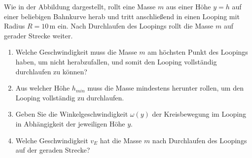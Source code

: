 \begin{ExerciseBlock}
Wie in der Abbildung dargestellt, rollt eine Masse $m$ aus einer Höhe $y=h$ auf einer beliebigen Bahnkurve herab und tritt anschließend in einen Looping mit Radius $R=10\,$m ein. Nach Durchlaufen des Loopings rollt die Masse $m$ auf gerader Strecke weiter.

\begin{center}
\end{center}

\begin{enumerate}
	\item Welche Geschwindigkeit muss die Masse $m$ am höchsten Punkt des Loopings haben, um nicht herabzufallen, und somit den Looping vollständig durchlaufen zu können?

	\item Aus welcher Höhe $h_{min}$ muss die Masse mindestens herunter rollen, um den Looping vollständig zu durchlaufen.

	\item Geben Sie die Winkelgeschwindigkeit $\omega(y)$ der Kreisbewegung im Looping in Abhängigkeit der jeweiligen Höhe $y$.

	\item Welche Geschwindigkeit $v_E$ hat die Masse $m$ nach Durchlaufen des Loopings auf der geraden Strecke?
\end{enumerate}
\end{ExerciseBlock}
